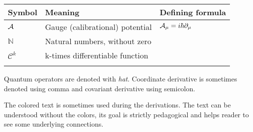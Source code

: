 

\begin{tabular} {@{}C{1.9cm}@{}p{8cm}@{}C{3.77cm}}
	\toprule
	\textbf{Symbol}& \textbf{Meaning}& \textbf{Defining formula}\\\bottomrule
	$\mathcal{A}$ & Gauge (calibrational) potential & $\mathcal{A}_\mu=i\hbar \partial_\mu$ \\
	$\mathbb{N}$ & Natural numbers, without zero \\
	$\mathcal{C}^k$ & k-times differentiable function \\
	
\bottomrule
{}
\end{tabular}

Quantum operators are denoted with \emph{hat}. Coordinate derivative is sometimes denoted using comma and covariant derivative using semicolon. 

The colored text is sometimes used during the derivations. The text can be understood without the colors, its goal is strictly pedagogical and helps reader to see some underlying connections.